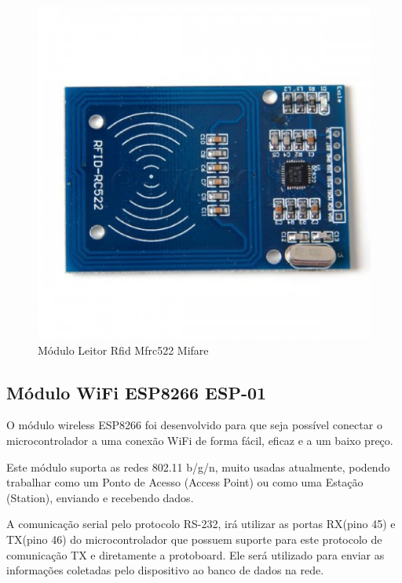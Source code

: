 \begin{figure}[!h]
  \centering
  \includegraphics[keepaspectratio=true,scale=0.5]{figuras/rfid.eps}
  \caption{Módulo Leitor Rfid Mfrc522 Mifare}
\end{figure}


\subsection{Módulo WiFi ESP8266 ESP-01}
O módulo wireless ESP8266 foi desenvolvido para que seja possível conectar o microcontrolador a uma conexão WiFi de forma fácil, eficaz e a um baixo preço.

Este módulo suporta as redes 802.11 b/g/n, muito usadas atualmente, podendo trabalhar como um Ponto de Acesso (Access Point) ou como uma Estação (Station), enviando e recebendo dados.

A comunicação serial pelo protocolo RS-232, irá utilizar as portas RX(pino 45) e TX(pino 46) do microcontrolador que possuem suporte para este protocolo de comunicação TX e diretamente a protoboard. Ele será utilizado para enviar as informações coletadas pelo dispositivo ao banco de dados na rede.
\pagebreak

